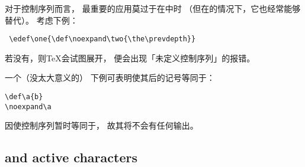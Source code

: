 \documentclass{book}
\begin{document}
对于控制序列而言，
最重要的应用莫过于在中时
（但在的情况下，它也经常能够替代）。
考虑下例：
\begin{verbatim}
 \edef\one{\def\noexpand\two{\the\prevdepth}}
\end{verbatim}
若没有，则{\TeX}会试图展开，
便会出现「未定义控制序列」的报错。

一个（没太大意义的）
下例可表明使其后的记号等同于：
\begin{verbatim}
\def\a{b}
\noexpand\a
\end{verbatim}
因使控制序列暂时等同于，
故其将不会有任何输出。

\subsection{\protect{} and active characters}
\end{document}
